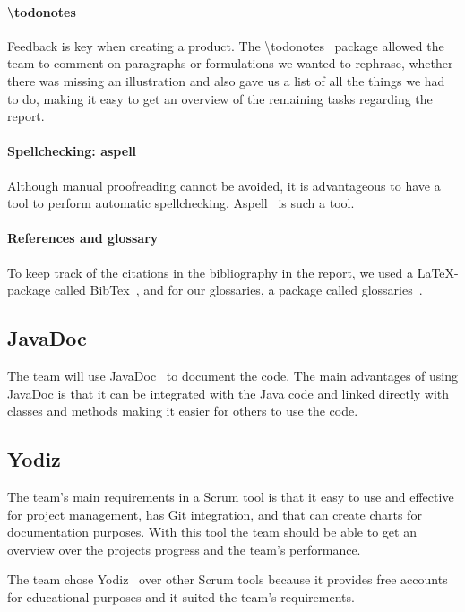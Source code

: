 \paragraph{\textbackslash todonotes}
Feedback is key when creating a product. The \textbackslash todonotes~\cite{todo} package allowed the team to comment on paragraphs or formulations we wanted to rephrase, whether there was missing an illustration and also gave us a list of all the things we had to do, making it easy to get an overview of the remaining tasks regarding the report.

\paragraph{Spellchecking: aspell}
Although manual proofreading cannot be avoided, it is advantageous to have a tool to perform automatic spellchecking. Aspell~\cite{aspell} is such a tool.

\paragraph{References and glossary}
To keep track of the citations in the bibliography in the report, we used a LaTeX-package called BibTex~\cite{bibtex}, and for our glossaries, a package called glossaries~\cite{glossaries}.


\subsection{JavaDoc}
The team will use JavaDoc~\cite{javadoc} to document the code. The main advantages of using JavaDoc is that it can be integrated with the Java code and linked directly with classes and methods making it easier for others to use the code.

\subsection{Yodiz}
The team's main requirements in a Scrum tool is that it easy to use and effective for project management, has Git integration, and that can create charts for documentation purposes. With this tool the team should be able to get an overview over the projects progress and the team's performance. 

The team chose Yodiz~\cite{yodiz} over other Scrum tools because it provides 
free accounts for educational purposes and it suited the team's requirements. 